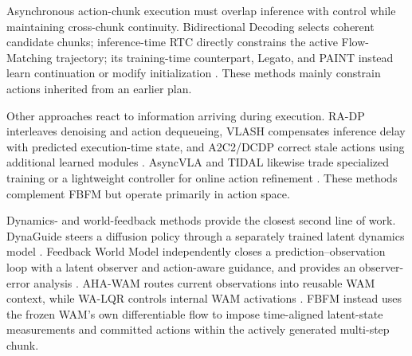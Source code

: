 Asynchronous action-chunk execution must overlap inference with control while
maintaining cross-chunk continuity. Bidirectional Decoding selects coherent
candidate chunks; inference-time RTC directly constrains the active
Flow-Matching trajectory; its training-time counterpart, Legato, and PAINT
instead learn continuation or modify initialization
\cite{liu2025bid,black2025realtime,black2025training,liu2026legato,ho2026paint}.
These methods mainly constrain actions inherited from an earlier plan.

Other approaches react to information arriving during execution. RA-DP
interleaves denoising and action dequeueing, VLASH compensates inference delay
with predicted execution-time state, and A2C2/DCDP correct stale actions using
additional learned modules \cite{ye2025radp,tang2025vlash,sendai2025a2c2,
wu2026dcdp}. AsyncVLA and TIDAL likewise trade specialized training or a
lightweight controller for online action refinement
\cite{jiang2026asyncvla,sun2026tidal}. These methods complement FBFM but operate
primarily in action space.

Dynamics- and world-feedback methods provide the closest second line of work.
DynaGuide steers a diffusion policy through a separately trained latent dynamics
model \cite{du2025dynaguide}. Feedback World Model independently closes a
prediction--observation loop with a latent observer and action-aware guidance,
and provides an observer-error analysis \cite{an2026feedback}. AHA-WAM routes
current observations into reusable WAM context, while WA-LQR controls internal
WAM activations \cite{cai2026ahawam,hong2026walqr}. FBFM instead uses the frozen
WAM's own differentiable flow to impose time-aligned latent-state measurements
and committed actions within the actively generated multi-step chunk.
